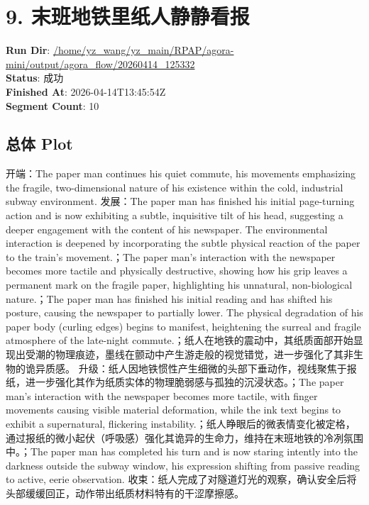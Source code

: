 \documentclass[11pt,a4paper]{article}
\begin{document}
\section{9. 末班地铁里纸人静静看报}
\textbf{Run Dir}: \url{/home/yz\_wang/yz\_main/RPAP/agora-mini/output/agora\_flow/20260414\_125332}\\
\textbf{Status}: 成功\\
\textbf{Finished At}: 2026-04-14T13:45:54Z\\
\textbf{Segment Count}: 10

\subsection*{总体 Plot}
开端：The paper man continues his quiet commute, his movements emphasizing the fragile, two-dimensional nature of his existence within the cold, industrial subway environment. 发展：The paper man has finished his initial page-turning action and is now exhibiting a subtle, inquisitive tilt of his head, suggesting a deeper engagement with the content of his newspaper. The environmental interaction is deepened by incorporating the subtle physical reaction of the paper to the train's movement.；The paper man's interaction with the newspaper becomes more tactile and physically destructive, showing how his grip leaves a permanent mark on the fragile paper, highlighting his unnatural, non-biological nature.；The paper man has finished his initial reading and has shifted his posture, causing the newspaper to partially lower. The physical degradation of his paper body (curling edges) begins to manifest, heightening the surreal and fragile atmosphere of the late-night commute.；纸人在地铁的震动中，其纸质面部开始显现出受潮的物理痕迹，墨线在颤动中产生游走般的视觉错觉，进一步强化了其非生物的诡异质感。 升级：纸人因地铁惯性产生细微的头部下垂动作，视线聚焦于报纸，进一步强化其作为纸质实体的物理脆弱感与孤独的沉浸状态。；The paper man's interaction with the newspaper becomes more tactile, with finger movements causing visible material deformation, while the ink text begins to exhibit a supernatural, flickering instability.；纸人睁眼后的微表情变化被定格，通过报纸的微小起伏（呼吸感）强化其诡异的生命力，维持在末班地铁的冷冽氛围中。；The paper man has completed his turn and is now staring intently into the darkness outside the subway window, his expression shifting from passive reading to active, eerie observation. 收束：纸人完成了对隧道灯光的观察，确认安全后将头部缓缓回正，动作带出纸质材料特有的干涩摩擦感。
\end{document}
